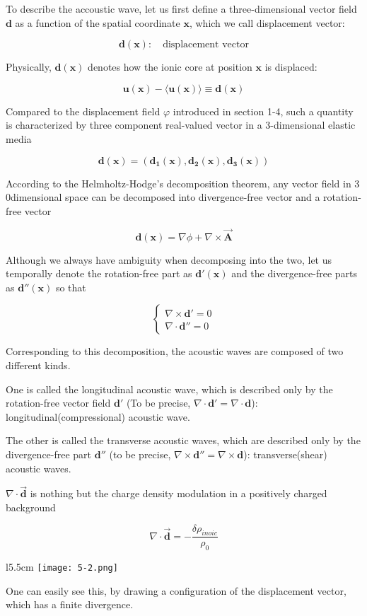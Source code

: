 ﻿\documentclass[twoside]{book}
\numberwithin{equation}{section}
\begin{document}
To describe the accoustic wave, let us first define a three-dimensional vector field $\bm d$ as a function of the spatial coordinate $\bm x$, which we call displacement vector:

\[\bm{d}(\bm{x}):\quad\text{displacement vector} \]

Physically, $\bm{d(x)}$ denotes how the ionic core at position $\bm x$ is displaced:

\[\bm{u(x) - \langle u(x)\rangle \equiv d(x)} \]

Compared to the displacement field $\varphi$ introduced in section 1-4, such a quantity is characterized by three component real-valued vector in a $3$-dimensional elastic media

\[\bm{d(x) = (d_1(x),d_2(x),d_3(x))} \]

According to the Helmholtz-Hodge's decomposition theorem, any vector field in $3$0dimensional space can be decomposed into divergence-free vector and a rotation-free vector

\[\bm{d(x)} = \nabla\phi + \nabla\times\vec{\bm{A}} \]

Although we always have ambiguity when decomposing into the two, let us temporally denote the rotation-free part as $\bm{d'(x)}$ and the divergence-free parts as $\bm{d''(x)}$ so that

\[\begin{cases}
\nabla\times\bm{d'} = 0\\
\nabla\cdot\bm{d''} = 0
\end{cases}\]

Corresponding to this decomposition, the acoustic waves are composed of two different kinds. 

One is called the longitudinal acoustic wave, which is described only by the rotation-free vector field $\bm{d'}$ (To be precise, $\nabla\cdot \bm{d'} = \nabla\cdot\bm{d}$): longitudinal(compressional) acoustic wave. 

The other is called the transverse acoustic waves, which are described only by the divergence-free part $\bm{d''}$ (to be precise, $\nabla\times\bm{d''} = \nabla\times\bm{d}$): transverse(shear) acoustic waves. 

$\nabla\cdot \vec{\bm{d}}$ is nothing but the charge density modulation in a positively charged background

\[\nabla\cdot\vec{\bm{d}} = -\frac{\delta\rho_{inoic}}{\rho_0}\]

\begin{wrapfigure}{l}{5.5cm}
\texttt{[image: 5-2.png]}
\end{wrapfigure}
One can easily see this, by drawing a configuration of the displacement vector, which has a finite divergence. 
\end{document}
